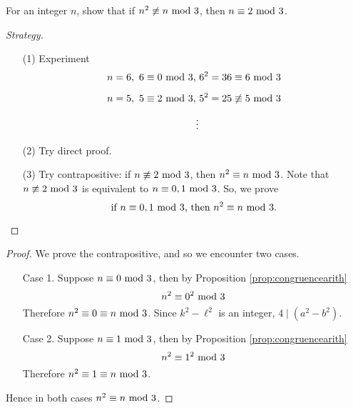 \begin{proposition}
For an integer $n$, show that if $n^2 \not\equiv n \text{ mod }{3}$, then $n \equiv 2 \text{ mod }{3}$.
\end{proposition}
\begin{proof}[Strategy]\hfill
\renewcommand{\qed}{}
\begin{itemize}
\item[(1)] Experiment
\begin{align*}
n = 6,\ 6 \equiv 0 \text{ mod }{3}, &\ 6^2 = 36 \equiv 6 \text{ mod }{3}\\[0.5em]
n = 5,\ 5 \equiv 2 \text{ mod }{3}, &\ 5^2 = 25 \not\equiv 5 \text{ mod }{3}\\[0.5em]
&\vdots
\end{align*}
\item[(2)] Try direct proof.
\item[(3)] Try contrapositive: if $n \not\equiv 2 \text{ mod }{3}$, then $n^2 \equiv n \text{ mod }{3}$. Note that $n \not\equiv 2 \text{ mod }{3}$ is equivalent to $n \equiv 0,1 \text{ mod }{3}$. So, we prove
\[\text{if $n \equiv 0,1 \text{ mod }{3}$, then $n^2 \equiv n \text{ mod }{3}$.}\]
\end{itemize}
\end{proof}
\begin{proof}
We prove the contrapositive, and so we encounter two cases. 
\begin{itemize}[leftmargin=4em]
\item[Case 1.] Suppose $n \equiv 0 \text{ mod }{3}$, then by Proposition \ref{prop:congruencearith}
\[n^2 \equiv 0^2 \text{ mod }{3}\]
Therefore $n^2 \equiv 0 \equiv n \text{ mod }{3}$.
Since $k^2 - \ell^2$ is an integer, $4\mid (a^2 - b^2)$.
\item[Case 2.] Suppose $n \equiv 1 \text{ mod }{3}$, then by Proposition \ref{prop:congruencearith}
\[n^2 \equiv 1^2 \text{ mod }{3}\]
Therefore $n^2 \equiv 1 \equiv n \text{ mod }{3}$.
\end{itemize}
Hence in both cases $n^2 \equiv n \text{ mod }{3}$.
\end{proof}

\vspace*{1em}

